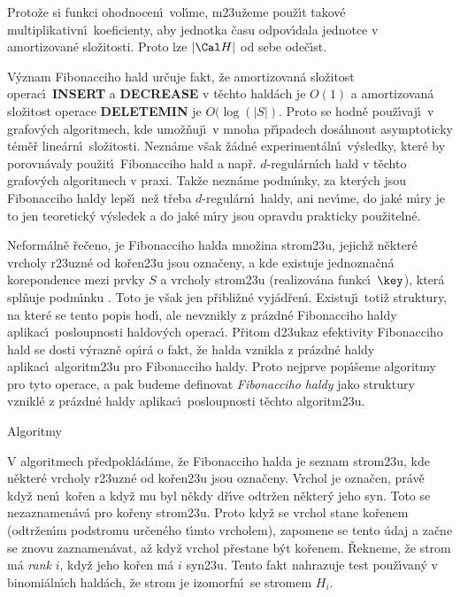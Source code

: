 \documentclass[a4paper,12pt]{article}
\begin{document}
\flushpar Proto\v ze si funkci ohodnocen\'\i\ vol\'\i me, 
m\accent23u\v zeme pou\v z\'\i t takov\'e multiplikativn\'\i\ 
koeficienty, aby jednotka \v casu odpov\'\i dala jednotce v 
amortizovan\'e slo\v zitosti. Proto lze $|\Cal H|$ od sebe ode\v c\'\i st.
\bigskip

\centerline{}
\medskip

\flushpar V\'yznam Fibonacciho hald ur\v cuje fakt, \v ze amortizovan\'a 
slo\v zitost operac\'\i\ {\bf INSERT} a {\bf DECREASE} v t\v echto hald\'ach je 
$O(1)$ a amortizovan\'a slo\v zitost operace {\bf DELETEMIN} je $
O(\log(|S|)$. 
Proto se hodn\v e pou\v z\'\i vaj\'\i\ v grafov\'ych algoritmech, 
kde umo\v z\v nuj\'\i\ v mnoha p\v r\'\i padech dos\'ahnout asymptoticky t\'em\v e\v r line\'arn\'\i\ 
slo\v zitosti. Nezn\'ame v\v sak \v z\'adn\'e  
expe\-riment\'aln\'\i\ v\'ysledky, kter\'e by porovn\'avaly pou\v zit\'\i\ Fibonacciho 
hald a nap\v r. $d$-regul\'arn\'\i ch hald v t\v echto grafov\'ych 
algoritmech v praxi. Tak\v ze nezn\'ame podm\'\i nky, za 
kter\'ych jsou Fibonacciho 
haldy lep\v s\'\i\ ne\v z t\v reba $d$-regul\'arn\'\i\ haldy, 
ani nev\'\i me, do jak\'e m\'\i ry je to jen teoretick\'y 
v\'ysledek a do jak\'e m\'\i ry jsou opravdu prakticky pou\v ziteln\'e. 
\medskip

\flushpar Neform\'aln\v e \v re\v ceno, je Fibonacciho halda mno\v zina 
strom\accent23u, jejich\v z n\v ekter\'e vrcholy r\accent23uzn\'e od 
ko\v ren\accent23u jsou ozna\v ceny, a kde existuje 
jednozna\v cn\'a korepondence mezi prvky $S$ a vrcholy 
strom\accent23u (realizov\'ana funkc\'\i\ $\key$), kter\'a spl\v nuje 
podm\'\i nku \thetag{usp}.  Toto je v\v sak jen p\v ribli\v z\-n\'e 
vyj\'ad\v ren\'\i .  Existuj\'\i\ toti\v z struktury, na kter\'e se tento 
popis hod\'\i , ale 
nevznikly z pr\'azd\-n\'e Fibonacciho haldy aplikac\'\i\ 
posloupnosti haldov\'ych  
operac\'\i .  P\v ritom d\accent23ukaz efekti\-vity Fibonacciho hald se 
dosti v\'yrazn\v e op\'\i r\'a o fakt, \v ze halda vznikla z pr\'azdn\'e 
haldy aplikac\'\i\ algoritm\accent23u pro Fibonacciho 
haldy. Proto nejprve pop\'\i\v seme algoritmy pro tyto 
ope\-race, a pak budeme
definovat \emph{Fibonacciho} \emph{haldy} jako struktury 
vznikl\'e z pr\'azdn\'e haldy aplikac\'\i\ posloupnosti 
t\v echto algoritm\accent23u.
\bigskip

\head
Algoritmy
\endhead

\flushpar V algoritmech p\v redpokl\'ad\'ame, \v ze Fibonacciho halda je 
seznam strom\accent23u, kde n\v ekter\'e vrcholy r\accent23uzn\'e od 
ko\v ren\accent23u jsou ozna\v ceny.  Vrchol je ozna\v cen, pr\'av\v e kdy\v z nen\'\i\ 
ko\v ren a kdy\v z mu byl n\v ekdy d\v r\'\i ve odtr\v zen n\v ekter\'y jeho syn. Toto se 
nezaznamen\'av\'a pro ko\v reny strom\accent23u. Proto kdy\v z se 
vrchol stane ko\v renem (odtr\v zen\'\i m podstromu ur\v cen\'eho 
t\'\i mto vrcholem),  
zapomene  se tento \'udaj a za\v cne se znovu zaznamen\'avat, 
a\v z kdy\v z vrchol p\v restane 
b\'yt ko\v renem. \v Rekneme, \v ze strom m\'a \emph{rank} $i$, kdy\v z 
jeho ko\v ren 
m\'a $i$ syn\accent23u. Tento fakt nahrazuje test pou\v z\'\i van\'y 
v binomi\'aln\'\i ch 
hald\'ach, \v ze strom je izomorfn\'\i\ se stromem $H_i$. 
\medskip
\end{document}

